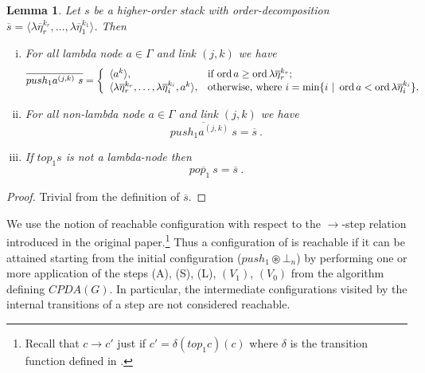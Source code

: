 \documentclass{article}
\newcommand{\ord}{\mathop{\mathrm{ord}}}
\newcommand{\theroot}{\circledast} %
\newtheorem{lemma}{Lemma}[section]
\theoremstyle{remark}
\theoremstyle{definition}
\newcommand\orddec\overline
\begin{document}
\begin{lemma}
\label{lem:push1pop1_orderdecompo} Let $s$ be a higher-order stack
with order-decomposition $\orddec{s} = \langle \lambda
\overline{\eta}_r^{k_r}, \ldots, \lambda \overline{\eta}_1^{k_1}
\rangle$. Then
\begin{enumerate}[i.]
\item For all lambda node $a \in \Gamma$ and link $(j,k)$ we have
 $$ \orddec{push_1 a^{(j,k)}~s} = \left\{
                                       \begin{array}{ll}
                                        \langle a^k \rangle, &  \hbox{if $\ord{a} \geq \ord{\lambda \overline{\eta}_r^{k_r}}$}; \\
                                         \langle \lambda \overline{\eta}_r^{k_r}, \ldots, \lambda
\overline{\eta}_i^{k_i}, a^k \rangle, & \hbox{otherwise, where $i = \min \{ i \ | \ \ord{a} <
\ord{\lambda \overline{\eta}_i^{k_i}} \}$.}
                                       \end{array}
                                     \right.$$

\item For all non-lambda node $a \in \Gamma$ and link $(j,k)$ we have
$$ \orddec{push_1 a^{(j,k)}~s} = \orddec{s} \ .$$

\item If $top_1 s$ is not a lambda-node then
$$ \orddec{pop_1~s} = \orddec{s} \ .$$
\end{enumerate}
\end{lemma}
\begin{proof}
  Trivial from the definition of  $\orddec{s}$.
\end{proof}


We use the notion of reachable configuration
with respect to the $\rightarrow$-step relation introduced in the original paper.\footnote{Recall that $c\rightarrow c'$
just if $c' = \delta(top_1 c)(c)$ where $\delta$ is the transition
function defined in \cite[Figure 2]{hague-sto07}.} Thus a configuration of is reachable if it can be attained starting from the initial configuration ($push_1 \theroot \bot_n$) by performing one or more application of the steps (A), (S), (L), $(V_1)$, $(V_0)$ from the algorithm defining $CPDA(G)$.
In particular, the intermediate configurations visited by the internal transitions of a step are not considered reachable.
\end{document}
